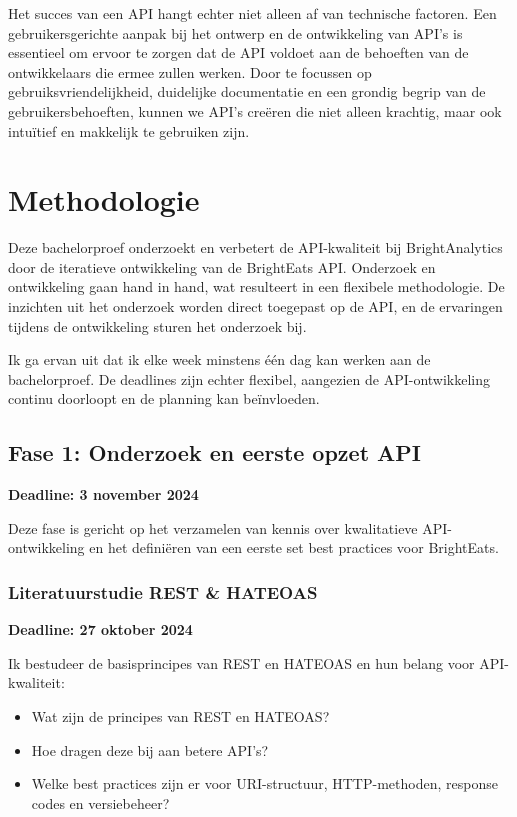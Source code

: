 \bigskip

Het succes van een API hangt echter niet alleen af van technische factoren. Een gebruikersgerichte aanpak bij het ontwerp en de ontwikkeling van API's is essentieel om ervoor te zorgen dat de API voldoet aan de behoeften van de ontwikkelaars die ermee zullen werken. Door te focussen op gebruiksvriendelijkheid, duidelijke documentatie en een grondig begrip van de gebruikersbehoeften, kunnen we API's creëren die niet alleen krachtig, maar ook intuïtief en makkelijk te gebruiken zijn.

\section{Methodologie}
\label{sec:methodologie}

Deze bachelorproef onderzoekt en verbetert de API-kwaliteit bij BrightAnalytics door de iteratieve ontwikkeling van de BrightEats API. Onderzoek en ontwikkeling gaan hand in hand, wat resulteert in een flexibele methodologie. De inzichten uit het onderzoek worden direct toegepast op de API, en de ervaringen tijdens de ontwikkeling sturen het onderzoek bij.

\bigskip
Ik ga ervan uit dat ik elke week minstens \'e\'en dag kan werken aan de bachelorproef. De deadlines zijn echter flexibel, aangezien de API-ontwikkeling continu doorloopt en de planning kan be\"invloeden.

\subsection{Fase 1: Onderzoek en eerste opzet API}

\textbf{Deadline: 3 november 2024}

\bigskip
Deze fase is gericht op het verzamelen van kennis over kwalitatieve API-ontwikkeling en het defini\"eren van een eerste set best practices voor BrightEats.

\subsubsection{Literatuurstudie REST \& HATEOAS}

\textbf{Deadline: 27 oktober 2024}

\bigskip
Ik bestudeer de basisprincipes van REST en HATEOAS en hun belang voor API-kwaliteit:

\begin{itemize}
  \item Wat zijn de principes van REST en HATEOAS?
  \item Hoe dragen deze bij aan betere API's?
  \item Welke best practices zijn er voor URI-structuur, HTTP-methoden, response codes en versiebeheer?
\end{itemize}


